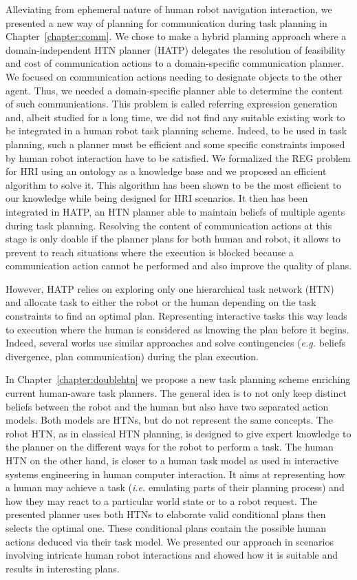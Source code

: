 \documentclass[a4paper,11pt,twoside]{StyleThese}
\begin{document}
Alleviating from ephemeral nature of human robot navigation interaction, we presented a new way of planning for communication during task planning in Chapter~\ref{chapter:comm}. We chose to make a hybrid planning approach where a domain-independent HTN planner (HATP) delegates the resolution of feasibility and cost of communication actions to a domain-specific communication planner. We focused on communication actions needing to designate objects to the other agent. Thus, we needed a domain-specific planner able to determine the content of such communications. This problem is called referring expression generation and, albeit studied for a long time, we did not find any suitable existing work to be integrated in a human robot task planning scheme. Indeed, to be used in task planning, such a planner must be efficient and some specific constraints imposed by human robot interaction have to be satisfied. We formalized the REG problem for HRI using an ontology as a knowledge base and we proposed an efficient algorithm to solve it. This algorithm has been shown to be the most efficient to our knowledge while being designed for HRI scenarios. It then has been integrated in HATP, an HTN planner able to maintain beliefs of multiple agents during task planning. Resolving the content of communication actions at this stage is only doable if the planner plans for both human and robot, it allows to prevent to reach situations where the execution is blocked because a communication action cannot be performed and also improve the quality of plans.

However, HATP relies on exploring only one hierarchical task network (HTN) and allocate task to either the robot or the human depending on the task constraints to find an optimal plan. Representing interactive tasks this way leads to execution where the human is considered as knowing the plan before it begins. Indeed, several works use similar approaches and solve contingencies (\textit{e.g.} beliefs divergence, plan communication) during the plan execution. 

In Chapter~\ref{chapter:doublehtn} we propose a new task planning scheme enriching current human-aware task planners. The general idea is to not only keep distinct beliefs between the robot and the human but also have two separated action models. Both models are HTNs, but do not represent the same concepts. The robot HTN, as in classical HTN planning, is designed to give expert knowledge to the planner on the different ways for the robot to perform a task. The human HTN on the other hand, is closer to a human task model as used in interactive systems engineering in human computer interaction. It aims at representing how a human may achieve a task (\textit{i.e.} emulating parts of their planning process) and how they may react to a particular world state or to a robot request. The presented planner uses both HTNs to elaborate valid conditional plans then selects the optimal one. These conditional plans contain the possible human actions deduced via their task model. We presented our approach in scenarios involving intricate human robot interactions and showed how it is suitable and results in interesting plans. 
\end{document}
